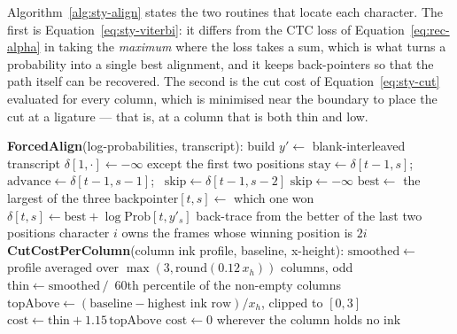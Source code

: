 Algorithm~\ref{alg:sty-align} states the two routines that locate each character. The first is Equation~\ref{eq:sty-viterbi}: it differs from the CTC loss of Equation~\ref{eq:rec-alpha} in taking the \emph{maximum} where the loss takes a sum, which is what turns a probability into a single best alignment, and it keeps back-pointers so that the path itself can be recovered. The second is the cut cost of Equation~\ref{eq:sty-cut} evaluated for every column, which is minimised near the boundary to place the cut at a ligature --- that is, at a column that is both thin and low.

\begin{algorithm}[!htbp]
\caption{Forced alignment, and the per-column cut cost that places the boundary}
\label{alg:sty-align}
\begin{algorithmic}[1]
\STATE \textbf{ForcedAlign}(log-probabilities, transcript):
\STATE \quad build $y'\leftarrow$ blank-interleaved transcript 
\STATE \quad $\delta[1,\cdot]\leftarrow-\infty$ except the first two positions
        \STATE $\mathrm{stay}\leftarrow\delta[t-1,s]$; \ $\mathrm{advance}\leftarrow\delta[t-1,s-1]$; \ $\mathrm{skip}\leftarrow\delta[t-1,s-2]$
            \STATE $\mathrm{skip}\leftarrow-\infty$
        \ENDIF
        \STATE $\mathrm{best}\leftarrow$ the largest of the three 
        \STATE $\mathrm{backpointer}[t,s]\leftarrow$ which one won
        \STATE $\delta[t,s]\leftarrow\mathrm{best}+\log\mathrm{Prob}[t,y'_s]$
    \ENDFOR
\ENDFOR
\STATE \quad back-trace from the better of the last two positions
\STATE \quad character $i$ owns the frames whose winning position is $2i$
\STATE
\STATE \textbf{CutCostPerColumn}(column ink profile, baseline, x-height):
\STATE \quad $\mathrm{smoothed}\leftarrow$ profile averaged over $\max(3,\mathrm{round}(0.12\,x_h))$ columns, odd
\STATE \quad $\mathrm{thin}\leftarrow\mathrm{smoothed}\,/\,$ 60th percentile of the non-empty columns
\STATE \quad $\mathrm{topAbove}\leftarrow(\text{baseline}-\text{highest ink row})/x_h$, clipped to $[0,3]$
\STATE \quad $\mathrm{cost}\leftarrow\mathrm{thin}+1.15\,\mathrm{topAbove}$
\STATE \quad $\mathrm{cost}\leftarrow0$ wherever the column holds no ink 
\end{algorithmic}
\end{algorithm}

